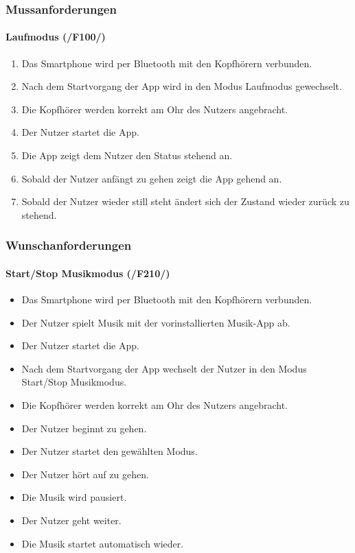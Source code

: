 \documentclass[a4paper,12pt]{article}
\begin{document}
    \subsubsection{Mussanforderungen}
      \paragraph{Laufmodus (/F100/)}
      \begin{enumerate}
        \item Das Smartphone wird per Bluetooth mit den Kopfhörern verbunden.
        \item Nach dem Startvorgang der App wird in den Modus \glqq Laufmodus\grqq{} gewechselt. %
        \item Die Kopfhörer werden korrekt am Ohr des Nutzers angebracht. %
        \item Der Nutzer startet die App.
        \item Die App zeigt dem Nutzer den Status \glqq stehend\grqq{} an.
        \item Sobald der Nutzer anfängt zu gehen zeigt die App \glqq gehend\grqq{} an.
        \item Sobald der Nutzer wieder still steht ändert sich der Zustand wieder zurück zu \glqq stehend\grqq. 
      \end{enumerate}

    \subsubsection{Wunschanforderungen}
      \paragraph{Start/Stop Musikmodus (/F210/)}
      \begin{itemize}
        \item[] Das Smartphone wird per Bluetooth mit den Kopfhörern verbunden.
        \item[] Der Nutzer spielt Musik mit der vorinstallierten Musik-App ab.
        \item[] Der Nutzer startet die App.
        \item[] Nach dem Startvorgang der App wechselt der Nutzer in den Modus \glqq Start/Stop Musikmodus\grqq .
        \item[] Die Kopfhörer werden korrekt am Ohr des Nutzers angebracht.
        \item[] Der Nutzer beginnt zu gehen.
        \item[] Der Nutzer startet den gewählten Modus.
        \item[] Der Nutzer hört auf zu gehen.
        \item[] Die Musik wird pausiert.
        \item[] Der Nutzer geht weiter.
        \item[] Die Musik startet automatisch wieder.
      \end{itemize}
      
\end{document}
